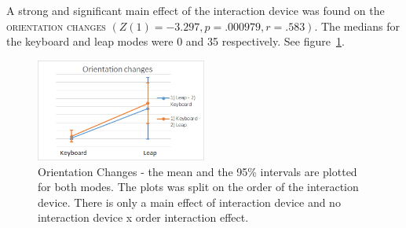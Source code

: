 A strong and significant main effect of the interaction device was found on the \textsc{orientation changes} $(Z(1) = -3.297, p = .000979, r = .583)$. The medians for the keyboard and leap modes were 0 and 35 respectively. See figure~\ref{fig:orientation_changes}.

\begin{figure}[H]
\centering
\includegraphics[width=0.5\textwidth]{imgs/results/orientation_changes}
\caption{Orientation Changes - the mean and the 95\% intervals are plotted for both modes. The plots was split on the order of the interaction device. There is only a main effect of interaction device and no interaction device x order interaction effect.}
\label{fig:orientation_changes}
\end{figure}



